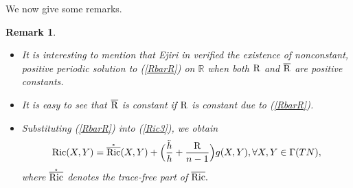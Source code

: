 \documentclass[10pt,leqno,oneside]{amsart}
\newtheorem{Rmk}{Remark}
\begin{document}
{            We now give some remarks.
    \begin{Rmk}\label{dddothddoth}
            \begin{itemize}[leftmargin=0.5cm, itemindent=0.4cm]
              \item[{\rm(1)}.] It is interesting to mention that Ejiri in {\rm\cite[Lemma 3.3]{Ejiri}} verified the existence of nonconstant, positive periodic solution to {\rm(\ref{RbarR})} on $\mathbb{R}$ when both ${\rm{R}}$ and $\overline{{\rm{R}}}$ are positive constants.
              \item[{\rm(2)}.] It is easy to see that $\overline{{\rm{R}}}$ is constant if ${\rm{R}}$ is constant due to {\rm(\ref{RbarR})}.
              \item[{\rm(3)}.] Substituting {\rm(\ref{RbarR})} into {\rm(\ref{Ric3})}, we obtain
        \[{\rm{Ric}}(X,Y)=\mathring{\overline{{\rm{Ric}}}}(X,Y)+\Big(\frac{\ddot{h}}{h}+\frac{{\rm{R}}}{n-1}\Big)g(X,Y),\forall X,Y\in\Gamma(TN ),\]
        where $\mathring{\overline{{\rm{Ric}}}}$ denotes the trace-free part of $\overline{{\rm{Ric}}}.$
            \end{itemize}

    \end{Rmk}

}
\end{document}
